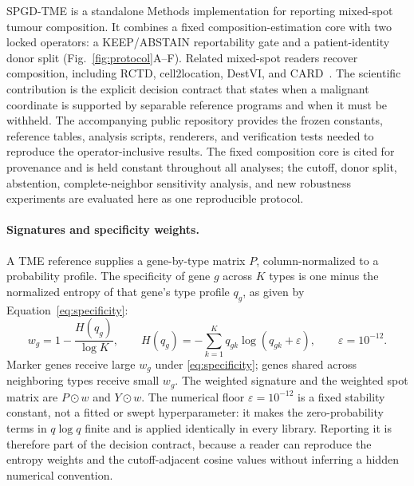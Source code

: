 SPGD-TME is a standalone Methods implementation for reporting mixed-spot tumour composition. It combines a fixed composition-estimation core with two locked operators: a KEEP/ABSTAIN reportability gate and a patient-identity donor split (Fig.~\ref{fig:protocol}A--F). Related mixed-spot readers recover composition, including RCTD, cell2location, DestVI, and CARD~\citep{Cable2022,Kleshchevnikov2022,Lopez2022,Ma2022}. The scientific contribution is the explicit decision contract that states when a malignant coordinate is supported by separable reference programs and when it must be withheld. The accompanying public repository provides the frozen constants, reference tables, analysis scripts, renderers, and verification tests needed to reproduce the operator-inclusive results. The fixed composition core is cited for provenance and is held constant throughout all analyses; the cutoff, donor split, abstention, complete-neighbor sensitivity analysis, and new robustness experiments are evaluated here as one reproducible protocol.

\paragraph{Signatures and specificity weights.}
A TME reference supplies a gene-by-type matrix \(P\), column-normalized to a probability profile. The specificity of gene \(g\) across \(K\) types is one minus the normalized entropy of that gene's type profile \(q_g\), as given by Equation~\eqref{eq:specificity}:
\begin{equation}
w_g=1-\frac{H(q_g)}{\log K},\qquad H(q_g)=-\sum_{k=1}^{K} q_{gk}\log(q_{gk}+\varepsilon),\qquad \varepsilon=10^{-12}.
\label{eq:specificity}
\end{equation}
Marker genes receive large \(w_g\) under \eqref{eq:specificity}; genes shared across neighboring types receive small \(w_g\). The weighted signature and the weighted spot matrix are \(P\odot w\) and \(Y\odot w\). The numerical floor \(\varepsilon=10^{-12}\) is a fixed stability constant, not a fitted or swept hyperparameter: it makes the zero-probability terms in \(q\log q\) finite and is applied identically in every library. Reporting it is therefore part of the decision contract, because a reader can reproduce the entropy weights and the cutoff-adjacent cosine values without inferring a hidden numerical convention.

